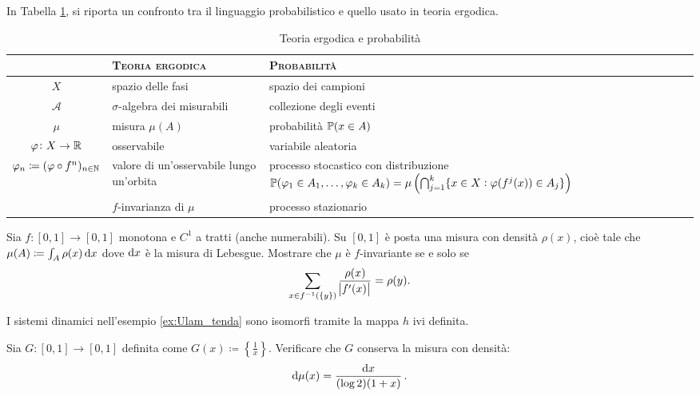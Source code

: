 In Tabella \ref{tab:ergodica-vs-probabilia}, si riporta un confronto tra il linguaggio probabilistico e quello usato in teoria ergodica.

\begin{table}[h!]
    \centering
    \begin{tabularx}{\textwidth}{cXX}
        & \textsc{Teoria ergodica} & \textsc{Probabilità} \\ \toprule
        $ X $ & spazio delle fasi & spazio dei campioni \\
        $ \mathcal{A} $ & $ \sigma $-algebra dei misurabili & collezione degli eventi \\
        $ \mu $ & misura $ \mu(A) $ & probabilità $ \mathbb{P}{(x \in A)} $ \\
        $ \varphi \colon X \to \mathbb{R} $ & osservabile & variabile aleatoria \\
        $ \varphi_n \coloneqq (\varphi \circ f^{n})_{n \in \mathbb{N}} $ & valore di un'osservabile lungo un'orbita & processo stocastico con distribuzione  $ \mathbb{P}{(\varphi_1 \in A_1, \ldots, \varphi_k \in A_k)} =  \mu\left(\bigcap_{j = 1}^{k} \{x \in X : \varphi(f^{j}(x)) \in A_j\}\right) $ \\
        & $ f $-invarianza di $ \mu $ & processo stazionario \\ \bottomrule
    \end{tabularx}
    \caption{Teoria ergodica e probabilità}
    \label{tab:ergodica-vs-probabilia}
\end{table}

\begin{exercise}
    Sia $ f \colon [0, 1] \to [0, 1] $ monotona e $ C^1 $ a tratti (anche numerabili). Su $ [0, 1] $ è posta una misura con densità $ \rho(x) $, cioè tale che $ \mu(A) \coloneqq \int_A \rho(x) \dif{x} $ dove $ \dif{x} $ è la misura di Lebesgue. Mostrare che $ \mu $ è $ f $-invariante se e solo se
    \[
        \sum_{x \in f^{-1}(\{y\})} \frac{\rho(x)}{\abs{f'(x)}} = \rho(y).
    \]
\end{exercise}

\begin{example}
    I sistemi dinamici nell'esempio \ref{ex:Ulam_tenda} sono isomorfi tramite la mappa $ h $ ivi definita.
\end{example}

\begin{exercise}
    Sia $ G\colon [0,1]\to [0,1] $ definita come $ G(x) \coloneqq \left\{ \frac{1}{x} \right\} $. Verificare che $ G $ conserva la misura con densità:
    \[ \dif{\mu}(x) = \frac{\dif x}{(\log 2)(1+x)} \, . \]
\end{exercise}

